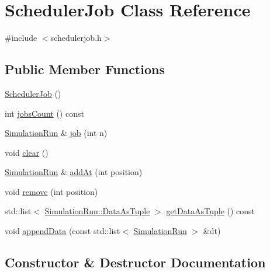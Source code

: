 \hypertarget{class_scheduler_job}{}\section{Scheduler\+Job Class Reference}
\label{class_scheduler_job}


{\ttfamily \#include $<$schedulerjob.\+h$>$}

\subsection*{Public Member Functions}
\begin{DoxyCompactItemize}
\item 
\mbox{\hyperlink{class_scheduler_job_abe46f5cd459ec2df502fa37af01f477e}{Scheduler\+Job}} ()
\item 
int \mbox{\hyperlink{class_scheduler_job_ac6251a7fc64485ea4dd487fd3339dcaa}{jobs\+Count}} () const
\item 
\mbox{\hyperlink{class_simulation_run}{Simulation\+Run}} \& \mbox{\hyperlink{class_scheduler_job_aeeb381d0346db271d4b142dc33752437}{job}} (int n)
\item 
void \mbox{\hyperlink{class_scheduler_job_a3986292c47e794c3c9b0b77c16b08b62}{clear}} ()
\item 
\mbox{\hyperlink{class_simulation_run}{Simulation\+Run}} \& \mbox{\hyperlink{class_scheduler_job_a39716c8b48bde9238072402b52a06257}{add\+At}} (int position)
\item 
void \mbox{\hyperlink{class_scheduler_job_a1262432c4ea412a896669b6b24d5b121}{remove}} (int position)
\item 
std\+::list$<$ \mbox{\hyperlink{class_simulation_run_a0088973963e3846e2543a2b14c686d7b}{Simulation\+Run\+::\+Data\+As\+Tuple}} $>$ \mbox{\hyperlink{class_scheduler_job_a46a05e5eddd572c6848483bf4ee134e5}{get\+Data\+As\+Tuple}} () const
\item 
void \mbox{\hyperlink{class_scheduler_job_ab16e3add1543cacfc70cb8f46bb867f2}{append\+Data}} (const std\+::list$<$ \mbox{\hyperlink{class_simulation_run}{Simulation\+Run}} $>$ \&dt)
\end{DoxyCompactItemize}


\subsection{Constructor \& Destructor Documentation}
\mbox{\label{class_scheduler_job_abe46f5cd459ec2df502fa37af01f477e}} 
